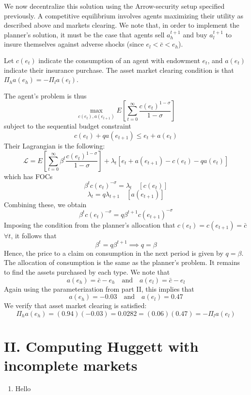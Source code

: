 \documentclass[12pt]{article}
\begin{document}
We now decentralize this solution using the Arrow-security setup specified previously. A competitive equilibrium involves agents maximizing their utility as described above and markets clearing. We note that, in order to implement the planner's solution, it must be the case that agents sell $a_h^{t+1}$ and buy $a_l^{t+1}$ to insure themselves against adverse shocks (since $e_l < \bar{c} < e_h$).

Let $c(e_t)$ indicate the consumption of an agent with endowment $e_t$, and $a(e_t)$ indicate their insurance purchase. The asset market clearing condition is that $\Pi_h a(e_h) = -\Pi_l a(e_l)$.

The agent's problem is thus
\[\max_{c(e_t), a(e_{t+1})} E\left[ \sum_{t=0}^{\infty} \frac{c(e_t)^{1-\sigma}}{1-\sigma}\right]\]
subject to the sequential budget constraint
\[c(e_t) + q a(e_{t+1}) \leq e_t + a(e_t)\]
Their Lagrangian is the following:
\[\mathcal{L} = E\left[\sum_{t=0}^{\infty} \beta^t\frac{c(e_t)^{1-\sigma}}{1-\sigma}\right] + \lambda_t [ e_t + a(e_{t+1}) - c(e_t) - q a(e_t)]\]
which has FOCs
\[\beta^t c(e_t)^{-\sigma} =\lambda_t \quad [c(e_t)]\]
\[\lambda_t = q \lambda_{t+1} \quad [a(e_{t+1})]\]
Combining these, we obtain
\[\beta^t c(e_t)^{-\sigma} = q \beta^{t+1} c(e_{t+1})^{-\sigma}\]
Imposing the condition from the planner's allocation that $c(e_t) = c(e_{t+1}) = \bar{c}$ $\forall t$, it follows that
\[\beta^t = q \beta^{t+1} \implies q = \beta\]
Hence, the price to a claim on consumption in the next period is given by $q= \beta$. The allocation of consumption is the same as the planner's problem. It remains to find the assets purchased by each type. We note that
\[a(e_h) = \bar{c} - e_h \quad \text{and} \quad a(e_l) = \bar{c} - e_l\]
Again using the parameterization from part II, this implies that
\[a(e_h) = -0.03 \quad \text{and} \quad a(e_l) = 0.47\]
We verify that asset market clearing is satisfied:
\[\Pi_h a(e_h) =(0.94) (-0.03) = 0.0282 = (0.06)(0.47) = -\Pi_l a(e_l) \]
\section{II. Computing Huggett with incomplete markets} 
\begin{enumerate}
    \item Hello
\end{enumerate}
\end{document}
